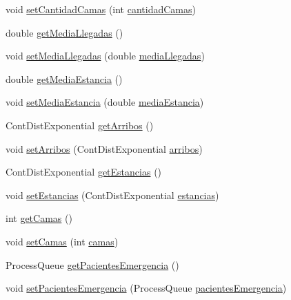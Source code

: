 \begin{DoxyCompactItemize}
\item 
void \hyperlink{class_modelo_hospital_ad211f5b9b2f0ee6ebd709c80aa23e669}{set\-Cantidad\-Camas} (int \hyperlink{class_modelo_hospital_a7976b96ea2a7a95f28b9ae175201b54d}{cantidad\-Camas})
\item 
double \hyperlink{class_modelo_hospital_a34ca65cd3ad714da1507f122611248a1}{get\-Media\-Llegadas} ()
\item 
void \hyperlink{class_modelo_hospital_acd298010a3718db2ad6b058d56dcb4d6}{set\-Media\-Llegadas} (double \hyperlink{class_modelo_hospital_a01a673aabc00aff4fa4efecf10e1c628}{media\-Llegadas})
\item 
double \hyperlink{class_modelo_hospital_afd8faf7a57f7e48573f3dfe59e545f58}{get\-Media\-Estancia} ()
\item 
void \hyperlink{class_modelo_hospital_a013c12ed71bd90b9c2d791351a2c30bf}{set\-Media\-Estancia} (double \hyperlink{class_modelo_hospital_a10dea35940463cb2f7b34e333ac799b9}{media\-Estancia})
\item 
Cont\-Dist\-Exponential \hyperlink{class_modelo_hospital_a690c485f67b47bd5fd89b47e8d9009b4}{get\-Arribos} ()
\item 
void \hyperlink{class_modelo_hospital_a098a0a42dd5f83aa727ca7bee606cada}{set\-Arribos} (Cont\-Dist\-Exponential \hyperlink{class_modelo_hospital_aa376037c68b7415b56f0f677d74c16dd}{arribos})
\item 
Cont\-Dist\-Exponential \hyperlink{class_modelo_hospital_a159d40ea87139a6f0797c998b4e66acf}{get\-Estancias} ()
\item 
void \hyperlink{class_modelo_hospital_a162688bbf6cc7d6099777d24200094fb}{set\-Estancias} (Cont\-Dist\-Exponential \hyperlink{class_modelo_hospital_ac2594297170d65562215179eae38e2a1}{estancias})
\item 
int \hyperlink{class_modelo_hospital_a7257e8bb34b52f399a0e1e5c990cd6db}{get\-Camas} ()
\item 
void \hyperlink{class_modelo_hospital_acafb744c8543f81aa4a4f46c1dc4da68}{set\-Camas} (int \hyperlink{class_modelo_hospital_abe9d4c46824ac9a664db21b4d2482f5b}{camas})
\item 
Process\-Queue \hyperlink{class_modelo_hospital_a8e741a498c41cf7ab3c4edb3771df4c2}{get\-Pacientes\-Emergencia} ()
\item 
void \hyperlink{class_modelo_hospital_a0089a647fb2d79610b9b577e60ec2c5c}{set\-Pacientes\-Emergencia} (Process\-Queue \hyperlink{class_modelo_hospital_a6a2e3dd496eac896ac92232d283db1be}{pacientes\-Emergencia})
\item 

\end{DoxyCompactItemize}
